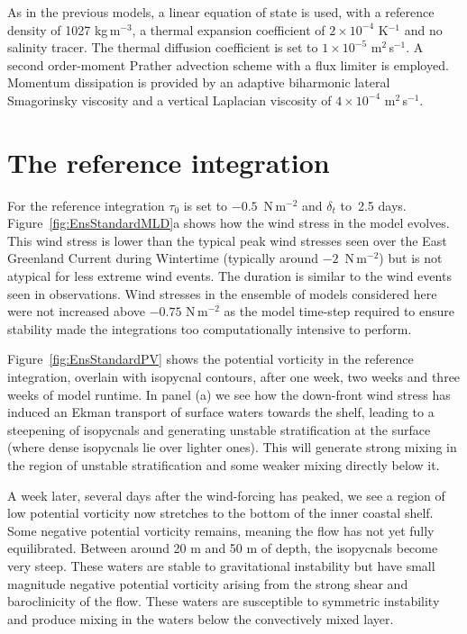 As in the previous models, a linear equation of state is used, with a reference density of 1027 kg\,m$^{-3}$, a thermal expansion coefficient of $2 \times 10^{-4}$ K$^{-1}$ and no salinity tracer. The thermal diffusion coefficient is set to $1 \times 10^{-5}$ m$^2$\,s$^{-1}$. A second order-moment Prather advection scheme with a flux limiter is employed. Momentum dissipation is provided by an adaptive biharmonic lateral Smagorinsky viscosity and a vertical Laplacian viscosity of $4 \times 10^{-4}$ m$^2$\,s$^{-1}$.  

\section{The reference integration}
\label{sec:IrmRef}
For the reference integration $\tau_0$ is set to $-0.5$~N\,m$^{-2}$ and $\delta_t$ to~2.5 days. Figure~\ref{fig:EnsStandardMLD}a shows how the wind stress in the model evolves. This wind stress is lower than the typical peak wind stresses seen over the East Greenland Current during Wintertime (typically around $-2$~N\,m$^{-2}$) but is not atypical for less extreme wind events. The duration is similar to the wind events seen in observations. Wind stresses in the ensemble of models considered here were not increased above $-0.75$ N\,m$^{-2}$ as the model time-step required to ensure stability made the integrations too computationally intensive to perform.

Figure~\ref{fig:EnsStandardPV} shows the potential vorticity in the reference integration, overlain with isopycnal contours, after one week, two weeks and three weeks of model runtime. In panel (a) we see how the down-front wind stress has induced an Ekman transport of surface waters towards the shelf, leading to a steepening of isopycnals and generating unstable stratification at the surface (where dense isopycnals lie over lighter ones). This will generate strong mixing in the region of unstable stratification and some weaker mixing directly below it.

A week later, several days after the wind-forcing has peaked, we see a region of low potential vorticity now stretches to the bottom of the inner coastal shelf. Some negative potential vorticity remains, meaning the flow has not yet fully equilibrated. Between around 20 m and 50 m of depth, the isopycnals become very steep. These waters are stable to gravitational instability but have small magnitude negative potential vorticity arising from the strong shear and baroclinicity of the flow. These waters are susceptible to symmetric instability and produce mixing in the waters below the convectively mixed layer.

